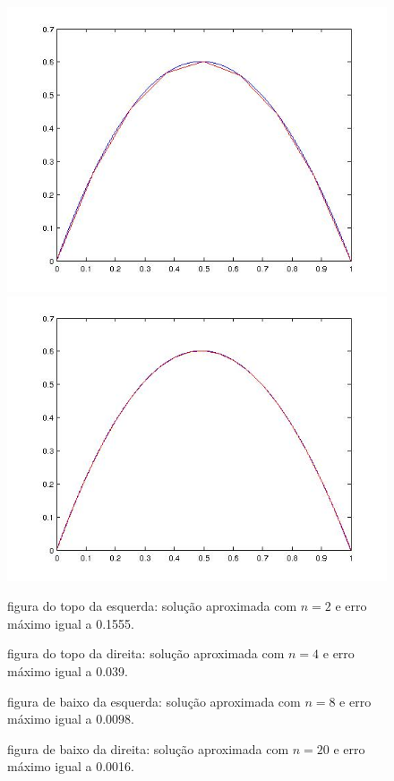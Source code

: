 \documentclass[a4paper]{article}
\begin{document}
\begin{figure}[h]
\begin{minipage}[t][5cm][b]{0,5\textwidth}
  \includegraphics[width=\textwidth]{n_8__0_0098.jpg}
  \end{minipage} 
  \begin{minipage}[t][5cm][b]{0,5\textwidth}
  \includegraphics[width=\textwidth]{n_20__0_0016.jpg}
  \end{minipage}
  \caption{figura do topo da esquerda: solução aproximada com \(n=2\) e erro máximo igual a 0.1555.}
  \caption{figura do topo da direita: solução aproximada com \(n=4\) e erro máximo igual a 0.039.}
\caption{figura de baixo da esquerda: solução aproximada com \(n=8\) e erro máximo igual a 0.0098.}
\caption{figura de baixo da direita: solução aproximada com \(n=20\) e erro máximo igual a 0.0016.}
  \end{figure}
  
\end{document}

